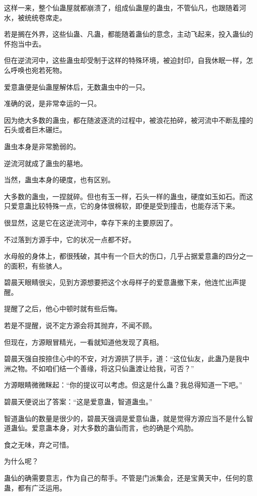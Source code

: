 \begin{this_body}
这样一来，整个仙蛊屋就都崩溃了，组成仙蛊屋的蛊虫，不管仙凡，也跟随着河水，被统统卷席走。

若是搁在外界，这些仙蛊、凡蛊，都能随着蛊仙的意念，主动飞起来，投入蛊仙的怀抱当中去。

但在逆流河中，这些蛊虫却受制于这样的特殊环境，被迫封印，自我休眠一样，怎么呼唤也宛若死物。

爱意蛊便是仙蛊屋解体后，无数蛊虫中的一只。

准确的说，是非常幸运的一只。

因为绝大多数的蛊虫，都在随波逐流的过程中，被浪花拍碎，被河流中不断乱撞的石头或者巨木碾烂。

蛊虫本身是非常脆弱的。

逆流河就成了蛊虫的墓地。

当然，蛊虫本身的硬度，也有区别。

大多数的蛊虫，一捏就碎。但也有玉一样，石头一样的蛊虫，硬度如玉如石。而这只爱意蛊比较特殊一点，它的身体很棉软，即便是受到撞击，也能存活下来。

很显然，这是它在这逆流河中，幸存下来的主要原因了。

不过落到方源手中，它的状况一点都不好。

水母般的身体上，都很残破，其中有一个巨大的伤口，几乎占据爱意蛊的四分之一的面积，有些骇人。

碧晨天眼睛很尖，见到方源想要把这个水母样子的爱意蛊撤下来，他连忙出声提醒。

提醒了之后，他心中顿时就有些后悔。

若是不提醒，说不定方源会将其抛弃，不闻不顾。

但现在，方源眼冒精光，一看就知道他发现了真相。

碧晨天强自按捺住心中的不安，对方源拱了拱手，道：“这位仙友，此蛊乃是我中洲之物。不如咱们结一个善缘，将这只仙蛊渡让给我，可否？”

方源眼睛微微眯起：“你的提议可以考虑。但这是什么蛊？我总得知道一下吧。”

碧晨天便说出了答案：“这是爱意蛊，智道蛊虫。”

智道蛊仙的数量是很少的，碧晨天强调是爱意仙蛊，就是觉得方源应当不是什么智道蛊仙。爱意蛊本身，对大多数的蛊仙而言，也的确是个鸡肋。

食之无味，弃之可惜。

为什么呢？

蛊仙的确需要意志，作为自己的帮手。不管是门派集会，还是宝黄天中，任何的意蛊，都有广泛运用。


\end{this_body}
